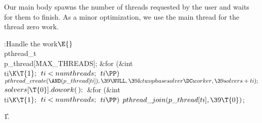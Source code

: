 Our main body spawns the number of threads requested by the user
and waits for them to finish.  As a minor optimization, we use
the main thread for the thread zero work.

\Y\B\4:Handle the work\X${}\E{}$\6
\\{pthread\_t}\\{p\_thread}[\.{MAX\_THREADS}];\6
\&{for} (\&{int} \\{ti}${}\K\T{1};{}$ ${}\\{ti}<\\{numthreads};{}$ ${}\\{ti}%
\PP){}$\1\5
${}\\{pthread\_create}({\AND}(\\{p\_thread}[\\{ti}]),\39\NULL,\39%
\&{twophasesolver}\DC\\{worker},\39\\{solvers}+\\{ti});{}$\2\6
${}\\{solvers}[\T{0}].\\{dowork}(\,);{}$\6
\&{for} (\&{int} \\{ti}${}\K\T{1};{}$ ${}\\{ti}<\\{numthreads};{}$ ${}\\{ti}%
\PP){}$\1\5
${}\\{pthread\_join}(\\{p\_thread}[\\{ti}],\39\T{0}){}$;\2\par

\U1.\fi


\inx
\fin
\con
